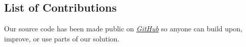\documentclass[final]{IEEEtran}
\begin{document}



\subsection{List of Contributions}
Our source code has been made public on \href{https://github.com/ryankoon/ScamBooter}{\textit{GitHub}} so anyone can build upon, improve, or use parts of our solution.
\end{document}
